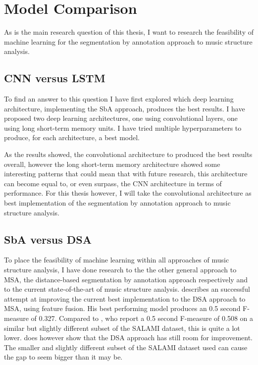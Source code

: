 \section{Model Comparison}
As is the main research question of this thesis, I want to research the feasibility of machine learning for the segmentation by annotation approach to music structure analysis. 

\subsection{CNN versus LSTM}
To find an answer to this question I have first explored which deep learning architecture, implementing the SbA approach, produces the best results. I have proposed two deep learning architectures, one using convolutional layers, one using long short-term memory units. I have tried multiple hyperparameters to produce, for each architecture, a best model.

As the results showed, the convolutional architecture to produced the best results overall, however the long short-term memory architecture showed some interesting patterns that could mean that with future research, this architecture can become equal to, or even surpass, the CNN architecture in terms of performance. For this thesis however, I will take the convolutional architecture as best implementation of the segmentation by annotation approach to music structure analysis.

\subsection{SbA versus DSA}
To place the feasibility of machine learning within all approaches of music structure analysis, I have done research to the the other general approach to MSA, the distance-based segmentation by annotation approach respectively and to the current state-of-the-art of music structure analysis. \textcite{Jesperthesis} describes an successful attempt at improving the current best implementation to the DSA approach to MSA, using feature fusion. His best performing model produces an 0.5 second F-measure of 0.327. Compared to \textcite{Grill2015music2}, who report a 0.5 second F-measure of 0.508 on a similar but slightly different subset of the SALAMI dataset, this is quite a lot lower. \textcite{Jesperthesis} does however show that the DSA approach has still room for improvement. The smaller and slightly different subset of the SALAMI dataset used can cause the gap to seem bigger than it may be.

